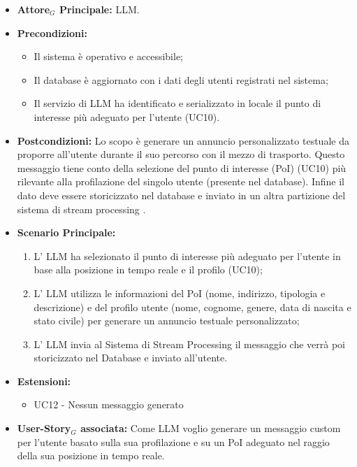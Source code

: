\documentclass[11pt]{article}
\begin{document}
\begin{justify}
\label{UC11}
\begin{itemize}
    \item \textbf{Attore$_G$ Principale:} LLM.
    \item \textbf{Precondizioni:} 
        \begin{itemize}
          \item Il sistema è operativo e accessibile;
          \item Il database è aggiornato con i dati degli utenti registrati nel sistema;
            \item Il servizio di LLM ha identificato e serializzato in locale il punto di interesse più adeguato per l'utente (UC10).
        \end{itemize}
      \item \textbf{Postcondizioni:} Lo scopo è generare un annuncio personalizzato testuale da proporre all'utente durante il suo percorso con il mezzo di trasporto. Questo messaggio tiene conto della selezione del punto di interesse (PoI) (UC10) più rilevante alla profilazione del singolo utente (presente nel database). Infine il dato deve essere storicizzato nel database e inviato in un altra partizione del sistema di stream processing .\\
    \item \textbf{Scenario Principale:} 
        \begin{enumerate}
        \item L' LLM ha selezionato il punto di interesse più adeguato per l'utente in base alla posizione in tempo reale e il profilo (UC10);
        \item L' LLM utilizza le informazioni del PoI (nome, indirizzo, tipologia e descrizione) e del profilo utente (nome, cognome, genere, data di nascita e stato civile) per generare un annuncio testuale personalizzato;
        \item L' LLM invia al Sistema di Stream Processing il messaggio che verrà poi storicizzato nel Database e inviato all'utente.
        \end{enumerate}
    \item \textbf{Estensioni: } 
    \begin{itemize}
        \item UC12 - Nessun messaggio generato
    \end{itemize}
    \item \textbf{User-Story$_G$ associata:} Come LLM voglio generare un messaggio custom per l'utente basato sulla sua profilazione e su un PoI adeguato nel raggio della sua posizione in tempo reale.
\end{itemize}


\end{justify}
\end{document}
